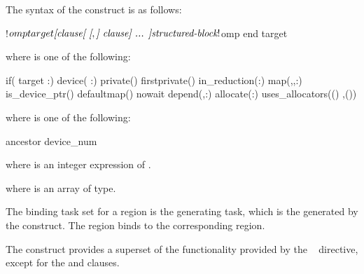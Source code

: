 \begin{samepage}
\smallskip
\begin{fortranspecific}
The syntax of the  construct is as follows:

\begin{ompfPragma}
!$omp target \plc{[clause[ [},\plc{] clause] ... ]}
    \plc{structured-block}
!$omp end target
\end{ompfPragma}

where  is one of the following:

\begin{indentedcodelist}
if(\plc{[} target :\plc{] scalar-logical-expression})
device(\plc{[ device-modifier} :\plc{] scalar-integer-expression})
private()
firstprivate()
in_reduction(:)
map(\plc{[[map-type-modifier[},\plc{] [map-type-modifier[},\plc{] ...] map-type}:\plc{ ] locator-list})
is_device_ptr()
defaultmap()
nowait
depend(\plc{[depend-modifier},\plc{] dependence-type }:)
allocate(\plc{[allocator}:\plc{]list})
uses_allocators(\plc{allocator[}()\plc{]}
	       \plc{[},\plc{allocator[}()\plc{] ...]})
\end{indentedcodelist}

where  is one of the following:
\begin{indentedcodelist}
ancestor
device_num
\end{indentedcodelist}

where  is an integer expression of  .

where  is an array of  type.

\end{fortranspecific}

\end{samepage}

\binding
The binding task set for a  region is the
generating task, which is the  generated
by the  construct. The 
region binds to the corresponding  region.

\descr
The  construct provides a superset of the functionality
provided by the ~ directive, except for
the  and  clauses.


